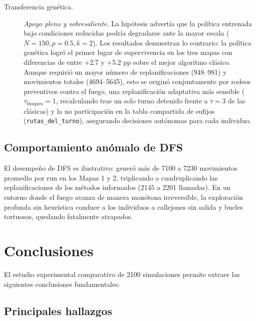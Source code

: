 \documentclass[11pt,letterpaper]{article}
\begin{document}
\begin{description}
\item[Transferencia genética.] \textit{Apoyo pleno y sobresaliente.} La hipótesis advertía que la política entrenada bajo condiciones reducidas podría degradarse ante la mayor escala ($N=150, p=0.5, k=2$). Los resultados demuestran lo contrario: la política genética logró el primer lugar de supervivencia en los tres mapas con diferencias de entre +2.7 y +5.2 pp sobre el mejor algoritmo clásico. Aunque requirió un mayor número de replanificaciones (948--981) y movimientos totales (4694--5645), esto se originó conjuntamente por rodeos preventivos contra el fuego, una replanificación adaptativa más sensible ($\tau_{\text{bloqueo}}=1$, recalculando tras un solo turno detenido frente a $\tau=3$ de las clásicas) y la no participación en la tabla compartida de sufijos (\texttt{rutas\_del\_turno}), asegurando decisiones autónomas para cada individuo.

\end{description}
\subsection{Comportamiento anómalo de DFS}
El desempeño de DFS es ilustrativo: generó más de 7100 a 7230 movimientos promedio por run en los Mapas 1 y 2, triplicando o cuadruplicando las replanificaciones de los métodos informados (2145 a 2201 llamadas). En un entorno donde el fuego avanza de manera monótona irreversible, la exploración profunda sin heurística conduce a los individuos a callejones sin salida y bucles tortuosos, quedando fatalmente atrapados.

\newpage
\section{Conclusiones}

El estudio experimental comparativo de 2100 simulaciones permite extraer las siguientes conclusiones fundamentales:

\subsection{Principales hallazgos}
\end{document}
